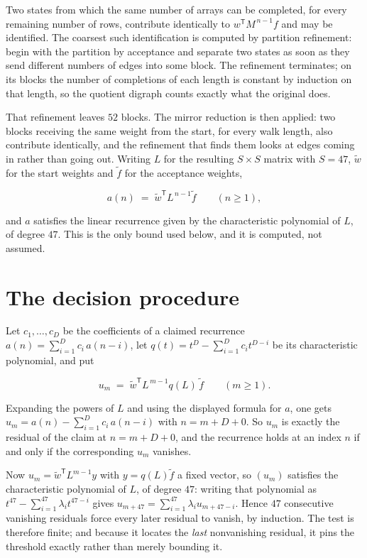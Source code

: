 \documentclass[11pt]{article}
\theoremstyle{definition}
\begin{document}
Two states from which the same number of arrays can be completed, for every remaining number of rows, contribute identically to $w^{\mathsf T}M^{\,n-1}f$ and may be identified. The coarsest such identification is computed by partition refinement: begin with the partition by acceptance and separate two states as soon as they send different numbers of edges into some block. The refinement terminates; on its blocks the number of completions of each length is constant by induction on that length, so the quotient digraph counts exactly what the original does.

That refinement leaves $52$ blocks. The mirror reduction is then applied: two blocks receiving the same weight from the start, for every walk length, also contribute identically, and the refinement that finds them looks at edges coming in rather than going out. Writing $L$ for the resulting $S \times S$ matrix with $S = 47$, $\tilde w$ for the start weights and $\tilde f$ for the acceptance weights,

\[a(n) \;=\; \tilde w^{\mathsf T} L^{\,n-1} \tilde f \qquad (n \ge 1),\]

and $a$ satisfies the linear recurrence given by the characteristic polynomial of $L$, of degree $47$. This is the only bound used below, and it is computed, not assumed.

\section{The decision procedure}

Let $c_1,\dots,c_D$ be the coefficients of a claimed recurrence $a(n) = \sum_{i=1}^{D} c_i\,a(n-i)$, let $q(t) = t^{D} - \sum_{i=1}^{D} c_i t^{D-i}$ be its characteristic polynomial, and put

\[u_m \;=\; \tilde w^{\mathsf T} L^{\,m-1} q(L)\,\tilde f \qquad (m \ge 1).\]

Expanding the powers of $L$ and using the displayed formula for $a$, one gets $u_m = a(n) - \sum_{i=1}^{D} c_i\,a(n-i)$ with $n = m + D + 0$. So $u_m$ is exactly the residual of the claim at $n = m + D + 0$, and the recurrence holds at an index $n$ if and only if the corresponding $u_m$ vanishes.

Now $u_m = \tilde w^{\mathsf T} L^{m-1} y$ with $y = q(L)\tilde f$ a fixed vector, so $(u_m)$ satisfies the characteristic polynomial of $L$, of degree $47$: writing that polynomial as $t^{47} - \sum_{i=1}^{47} \lambda_i t^{47-i}$ gives $u_{m+47} = \sum_{i=1}^{47} \lambda_i u_{m+47-i}$. Hence $47$ consecutive vanishing residuals force every later residual to vanish, by induction. The test is therefore finite; and because it locates the {\itshape last} nonvanishing residual, it pins the threshold exactly rather than merely bounding it.
\end{document}
